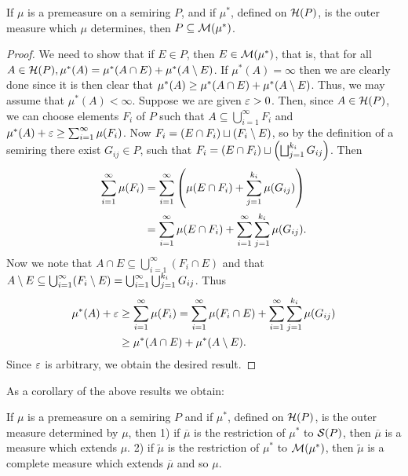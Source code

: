 \begin{theorem}
If $\mu$ is a premeasure on a semiring $P$, and if $\mu^*$, defined on ${\cal H}(P)$, is the outer measure which $\mu$ determines, then $P \subseteq {\cal M}(\mu^*)$.
\end{theorem}
\begin{proof}
We need to show that if $E \in P$, then $E \in {\cal M}(\mu^*)$, that is, that for all $A \in {\cal H}(P), \mu^*(A)=\mu^*(A \cap E)+\mu^*(A\setminus E)$. If $\mu^*(A)=\infty$ then we are clearly done since it is then clear that $\mu^*(A) \geq \mu^*(A \cap E)+\mu^*(A\setminus E)$. Thus, we may assume that $\mu^*(A)<\infty$. Suppose we are given $\varepsilon>0$. Then, since $A \in {\cal H}(P)$, we can choose elements $F_i$ of $P$ such that $A \subseteq \bigcup_{i=1}^\infty F_i$ and $\mu^*(A)+\varepsilon \geq \sum_{i=1}^\infty \mu(F_i)$. Now $F_i=(E \cap F_i) \sqcup(F_i\setminus E)$, so by the definition of a semiring there exist $G_{ij} \in P$, such that $F_i=(E \cap F_i) \sqcup\left(\bigsqcup_{j=1}^{k_i}G_{ij}\right)$. Then
\begin{align*}
\sum_{i=1}^\infty \mu(F_i)&=\sum_{i=1}^\infty\left(\mu(E \cap F_i)+\sum_{j=1}^{k_i} \mu(G_{i j})\right) \\
&=\sum_{i=1}^\infty \mu(E \cap F_i)+\sum_{i=1}^\infty \sum_{j=1}^{k_i} \mu(G_{i j}).
\end{align*}
Now we note that $A \cap E\subseteq \bigcup_{i=1}^\infty(F_i \cap E)$ and that $A\setminus E\subseteq \bigcup_{i=1}^\infty(F_i\setminus E)=\bigcup_{i=1}^\infty \bigcup_{j=1}^{k_i} G_{ij} $. Thus
\begin{align*}
    \mu^*(A)+\varepsilon&\geq\sum_{i=1}^\infty\mu(F_i)=\sum_{i=1}^\infty \mu(F_i \cap E)+\sum_{i=1}^\infty \sum_{j=1}^{k_i}\mu(G_{i j})\\
    &\geq\mu^*(A \cap E)+\mu^*(A\setminus E).
\end{align*}
Since $\varepsilon$ is arbitrary, we obtain the desired result.
\end{proof}

As a corollary of the above results we obtain:

\begin{theorem}
\label{thm:measure extension thm}
If $\mu$ is a premeasure on a semiring $P$ and if $\mu^*$, defined on ${\cal H}(P)$, is the outer measure determined by $\mu$, then 1) if $\overline{\mu}$ is the restriction of $\mu^*$ to ${\cal S}(P)$, then $\overline{\mu}$ is a measure which extends $\mu$. 2) if $\widetilde{\mu}$ is the restriction of $\mu^*$ to ${\cal M}(\mu^*)$, then $\widetilde{\mu}$ is a complete measure which extends $\overline{\mu}$ and so $\mu$.
\end{theorem}

